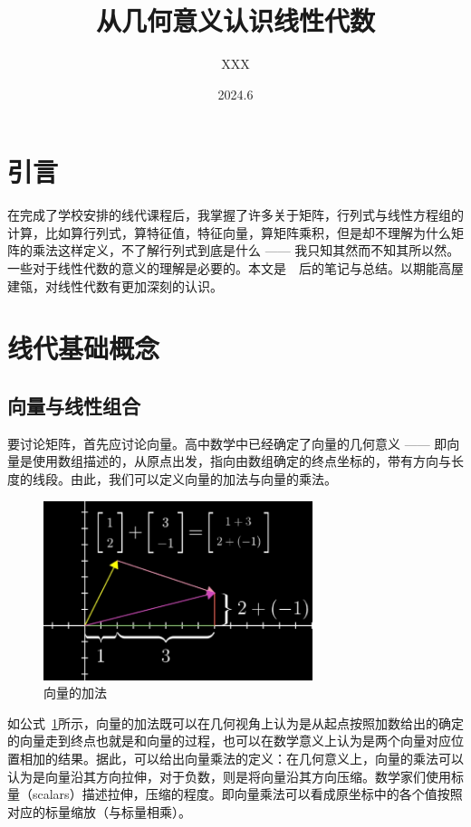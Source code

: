 \documentclass[UTF8]{ctexart}
\title{从几何意义认识线性代数}
\author[*]{XXX}
\affil[*]{XXXX}
\date{2024.6}
\begin{document}
\maketitle
\section*{引言}

在完成了学校安排的线代课程后，我掌握了许多关于矩阵，行列式与线性方程组的计算，比如算行列式，算特征值，特征向量，算矩阵乘积，但是却不理解为什么矩阵的乘法这样定义，不了解行列式到底是什么 —— 我只知其然而不知其所以然。一些对于线性代数的意义的理解是必要的。本文是~\cite{Essenceoflinearalgebra}~\cite{linearalgebraforeveryone}后的笔记与总结。以期能高屋建瓴，对线性代数有更加深刻的认识。

\pagebreak

\tableofcontents

\pagebreak

\section{线代基础概念}

\subsection{向量与线性组合}

要讨论矩阵，首先应讨论向量。高中数学中已经确定了向量的几何意义 —— 即向量是使用数组描述的，从原点出发，指向由数组确定的终点坐标的，带有方向与长度的线段。由此，我们可以定义向量的加法与向量的乘法。

\begin{figure}[hb]
    \centering
    \includegraphics[width=0.7\textwidth]{./figs/vector_add.png}
    \caption{向量的加法}
    \label{fig:vector_add}
\end{figure}

如公式~\ref{fig:vector_add}所示，向量的加法既可以在几何视角上认为是从起点按照加数给出的确定的向量走到终点也就是和向量的过程，也可以在数学意义上认为是两个向量对应位置相加的结果。据此，可以给出向量乘法的定义：在几何意义上，向量的乘法可以认为是向量沿其方向拉伸，对于负数，则是将向量沿其方向压缩。数学家们使用标量（scalars）描述拉伸，压缩的程度。即向量乘法可以看成原坐标中的各个值按照对应的标量缩放（与标量相乘）。
\end{document}
